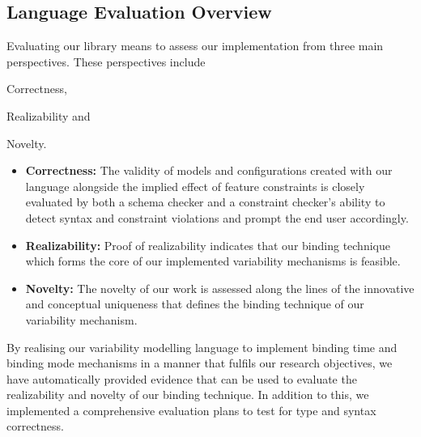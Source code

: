 \documentclass[conference]{IEEEtran}
\begin{document}
\subsection{Language Evaluation Overview}
Evaluating our library means to assess our implementation from three main perspectives. These perspectives include \begin{enumerate*}[label=(\roman*)]
\item Correctness,
\item Realizability and
\item Novelty.
\end{enumerate*}
\begin{itemize}
    \item \textbf{Correctness:} The validity of models and configurations created with our language alongside the implied effect of feature constraints is closely evaluated by both a schema checker and a constraint checker's ability to detect syntax and constraint violations and prompt the end user accordingly.
    
    \item \textbf{Realizability:} Proof of realizability indicates that our binding technique which forms the core of our implemented variability mechanisms is feasible.
    
    \item \textbf{Novelty:} The novelty of our work is assessed along the lines of the innovative and conceptual uniqueness that defines the binding technique of our variability mechanism.
\end{itemize}

By realising our variability modelling language to implement binding time and binding mode mechanisms in a manner that fulfils our research objectives, we have automatically provided evidence that can be used to evaluate the realizability and novelty of our binding technique. In addition to this, we implemented a comprehensive evaluation plans to test for type and syntax correctness.
\end{document}
